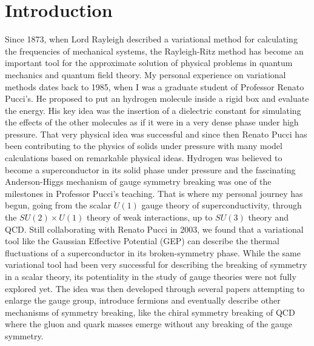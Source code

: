 \documentclass[aps,preprint]{revtex4}
\begin{document}
\section{Introduction}\label{sec1}

Since 1873, when Lord Rayleigh\cite{rayleigh} described a variational method for calculating the
frequencies of mechanical systems, the Rayleigh-Ritz method has
become an important tool for the approximate solution of physical problems in
quantum mechanics and quantum field theory. My personal experience on variational
methods dates back to 1985, when I was a graduate student of Professor Renato Pucci's.
He proposed to put an hydrogen molecule inside a rigid box and evaluate the
energy. His key idea was the insertion of a dielectric constant for simulating the
effects of the other molecules as if it were in a very dense phase under high pressure\cite{pucci}. 
That very physical idea was successful and since then Renato Pucci has been contributing to
the physics of solids under pressure with many  model calculations based on remarkable physical ideas.
Hydrogen was believed to become a superconductor in its solid phase under pressure and the fascinating
Anderson-Higgs mechanism of gauge symmetry breaking was one of the milestones in Professor Pucci's teaching.
That is where my personal journey has begun, going from the scalar $U(1)$ gauge 
theory of superconductivity\cite{gaussian,interpolation},
through the $SU(2)\times U(1)$ theory of weak interactions\cite{su2,LR,var,light,bubble}, up to $SU(3)$ 
theory and QCD\cite{sigma,sigma2,gep2,varqed,varqcd,genself,ptqcd2}. Still collaborating with
Renato Pucci in 2003, we found that a variational tool like the Gaussian Effective Potential (GEP) can describe
the thermal fluctuations of a superconductor in its broken-symmetry phase\cite{gaussian,interpolation}. 
While the same variational tool had
been very successful for describing the breaking of symmetry in a scalar theory\cite{stevenson}, its potentiality
in the study of gauge theories were not fully explored yet. The idea was then developed through several 
papers attempting to enlarge the gauge group\cite{su2,LR}, introduce fermions\cite{AF,HT} 
and eventually describe other mechanisms of
symmetry breaking, like the chiral symmetry breaking of 
QCD\cite{ptqcd2,ptqcd0,ptqcd,analyt,scaling}
where the gluon and quark masses emerge without any breaking of the gauge symmetry.
\end{document}
